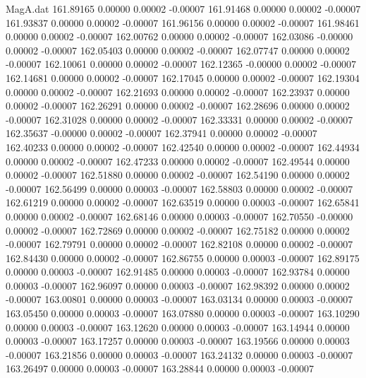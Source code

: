 \begin{filecontents}{MagA.dat}
 161.89165    0.00000    0.00002   -0.00007
 161.91468    0.00000    0.00002   -0.00007
 161.93837    0.00000    0.00002   -0.00007
 161.96156    0.00000    0.00002   -0.00007
 161.98461    0.00000    0.00002   -0.00007
 162.00762    0.00000    0.00002   -0.00007
 162.03086   -0.00000    0.00002   -0.00007
 162.05403    0.00000    0.00002   -0.00007
 162.07747    0.00000    0.00002   -0.00007
 162.10061    0.00000    0.00002   -0.00007
 162.12365   -0.00000    0.00002   -0.00007
 162.14681    0.00000    0.00002   -0.00007
 162.17045    0.00000    0.00002   -0.00007
 162.19304    0.00000    0.00002   -0.00007
 162.21693    0.00000    0.00002   -0.00007
 162.23937    0.00000    0.00002   -0.00007
 162.26291    0.00000    0.00002   -0.00007
 162.28696    0.00000    0.00002   -0.00007
 162.31028    0.00000    0.00002   -0.00007
 162.33331    0.00000    0.00002   -0.00007
 162.35637   -0.00000    0.00002   -0.00007
 162.37941    0.00000    0.00002   -0.00007
 162.40233    0.00000    0.00002   -0.00007
 162.42540    0.00000    0.00002   -0.00007
 162.44934    0.00000    0.00002   -0.00007
 162.47233    0.00000    0.00002   -0.00007
 162.49544    0.00000    0.00002   -0.00007
 162.51880    0.00000    0.00002   -0.00007
 162.54190    0.00000    0.00002   -0.00007
 162.56499    0.00000    0.00003   -0.00007
 162.58803    0.00000    0.00002   -0.00007
 162.61219    0.00000    0.00002   -0.00007
 162.63519    0.00000    0.00003   -0.00007
 162.65841    0.00000    0.00002   -0.00007
 162.68146    0.00000    0.00003   -0.00007
 162.70550   -0.00000    0.00002   -0.00007
 162.72869    0.00000    0.00002   -0.00007
 162.75182    0.00000    0.00002   -0.00007
 162.79791    0.00000    0.00002   -0.00007
 162.82108    0.00000    0.00002   -0.00007
 162.84430    0.00000    0.00002   -0.00007
 162.86755    0.00000    0.00003   -0.00007
 162.89175    0.00000    0.00003   -0.00007
 162.91485    0.00000    0.00003   -0.00007
 162.93784    0.00000    0.00003   -0.00007
 162.96097    0.00000    0.00003   -0.00007
 162.98392    0.00000    0.00002   -0.00007
 163.00801    0.00000    0.00003   -0.00007
 163.03134    0.00000    0.00003   -0.00007
 163.05450    0.00000    0.00003   -0.00007
 163.07880    0.00000    0.00003   -0.00007
 163.10290    0.00000    0.00003   -0.00007
 163.12620    0.00000    0.00003   -0.00007
 163.14944    0.00000    0.00003   -0.00007
 163.17257    0.00000    0.00003   -0.00007
 163.19566    0.00000    0.00003   -0.00007
 163.21856    0.00000    0.00003   -0.00007
 163.24132    0.00000    0.00003   -0.00007
 163.26497    0.00000    0.00003   -0.00007
 163.28844    0.00000    0.00003   -0.00007

\end{filecontents}
